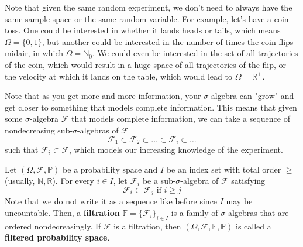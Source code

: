 \documentclass{article}
\begin{document}
      Note that given the same random experiment, we don't need to always have the same sample space or the same random variable. For example, let's have a coin toss. One could be interested in whether it lands heads or tails, which means $\Omega = \{0, 1\}$, but another could be interested in the number of times the coin flips midair, in which $\Omega = \mathbb{N}_0$. We could even be interested in the set of all trajectories of the coin, which would result in a huge space of all trajectories of the flip, or the velocity at which it lands on the table, which would lead to $\Omega = \mathbb{R}^+$. 

      Note that as you get more and more information, your $\sigma$-algebra can "grow" and get closer to something that models complete information. This means that given some $\sigma$-algebra $\mathcal{F}$ that models complete information, we can take a sequence of nondecreasing sub-$\sigma$-algebras of $\mathcal{F}$ 
      \begin{equation}
        \mathcal{F}_1 \subset \mathcal{F}_2 \subset \ldots \subset \mathcal{F}_i \subset \ldots
      \end{equation}
      such that $\mathcal{F}_i \subset \mathcal{F}$, which models our increasing knowledge of the experiment. 

      \begin{definition}[Filtration]
        Let $(\Omega, \mathcal{F}, \mathbb{P})$ be a probability space and $I$ be an index set with total order $\geq$ (usually, $\mathbb{N}, \mathbb{R}$). For every $i \in I$, let $\mathcal{F}_i$ be a sub-$\sigma$-algebra of $\mathcal{F}$ satisfying 
        \begin{equation}
          \mathcal{F}_i \subset \mathcal{F}_j \text{ if } i \geq j
        \end{equation}
        Note that we do not write it as a sequence like before since $I$ may be uncountable. Then, a \textbf{filtration} $\mathbb{F} = \{\mathcal{F}_i\}_{i \in I}$ is a family of $\sigma$-algebras that are ordered nondecreasingly. If $\mathcal{F}$ is a filtration, then $(\Omega, \mathcal{F}, \mathbb{F}, \mathbb{P})$ is called a \textbf{filtered probability space}. 
      \end{definition}
\end{document}
